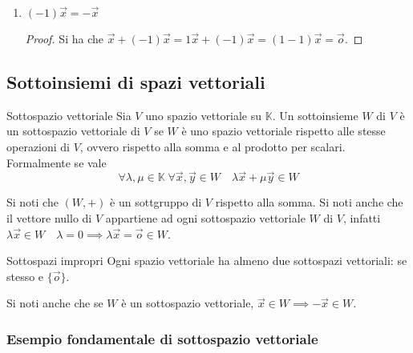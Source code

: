 \begin{enumerate}
\begin{proof}
      $\vec{0}=\lambda\vec{o}$.\\
      L'altro vers ($\Rightarrow$) dice che $\lambda\vec{x}=\vec{o}$. Se $\lambda=0$ è
      immediato. Se $\lambda\neq0$, sicuramente $\exists\lambda^{-1}$. Possiamo allora
      scrivere $\vec{o}=\lambda^{-1}\vec{o}=\lambda^{-1}(\lambda\vec{o}\vec{x})=
      (\lambda^{-1}\lambda)\vec{x}=\vec{x}$.
    \end{proof}
  \item $(-1)\vec{x} = -\vec{x}$
    \begin{proof}
      Si ha che $\vec{x}+(-1)\vec{x}=1\vec{x}+(-1)\vec{x}=(1-1)\vec{x}=\vec{o}$.
    \end{proof}
\end{enumerate}

\subsection{Sottoinsiemi di spazi vettoriali}%
\label{sub:sottoinsiemi_di_spazi_vettoriali}

\begin{Def}{Sottospazio vettoriale}
  Sia $V$ uno spazio vettoriale su $\mathbb{K}$. Un sottoinsieme $W$ di $V$ è un
  sottospazio vettoriale di $V$ se $W$ è uno spazio vettoriale rispetto alle stesse
  operazioni di $V$, ovvero rispetto alla somma e al prodotto per scalari. Formalmente
  se vale
  \begin{equation*}
    \forall\lambda,\mu\in\mathbb{K}\;\forall\vec{x},\vec{y}\in W\quad
    \lambda\vec{x}+\mu\vec{y}\in W
  \end{equation*}
\end{Def}
Si noti che $(W,+)$ è un sottgruppo di $V$ rispetto alla somma. Si noti anche che il
vettore nullo di $V$ appartiene ad ogni sottospazio vettoriale $W$ di $V$, infatti
$\lambda\vec{x}\in W\quad\lambda=0\implies\lambda\vec{x}=\vec{o}\in W$.

\begin{SubDef}{Sottospazi impropri}
  Ogni spazio vettoriale ha almeno due sottospazi vettoriali: se stesso e $\{\vec{o}\}$.
\end{SubDef}

Si noti anche che se $W$ è un sottospazio vettoriale, $\vec{x}\in W\implies-\vec{x}\in
W$.

\subsubsection{Esempio fondamentale di sottospazio vettoriale}%
\label{ssub:esempio_fondamentale_di_sottospazio_vettoriale}

